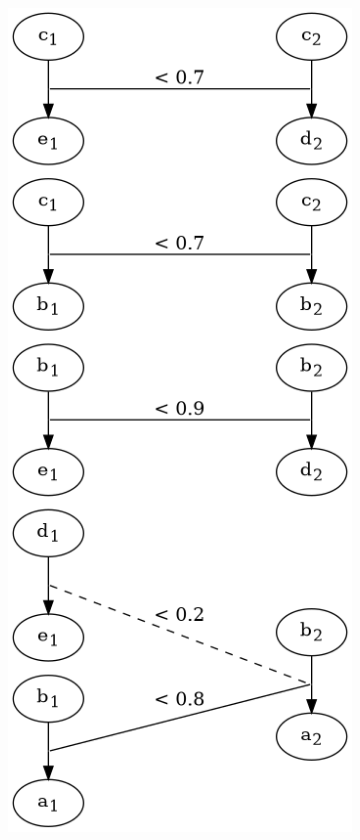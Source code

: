 \begin{frame}
\begin{figure}[htbp]
\begin{subfigure}[t]{0.20\textwidth}
			\includegraphics[width=\linewidth,valign=t]{inc/fuzzy_graph_theory/fuzzy_graph_morphism_external_rho_mu.png}

\end{subfigure}
\end{figure}
\end{frame}
